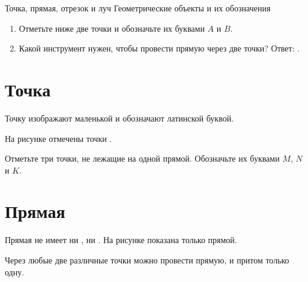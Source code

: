 
\worksheettitle
  {Точка, прямая, отрезок и луч}
  {Геометрические объекты и их обозначения}

\studentnameblock

\begin{checkpointbox}
  \begin{enumerate}[label=\textbf{\arabic*.},itemsep=0.45em]
    \item Отметьте ниже две точки и обозначьте их буквами \(A\) и \(B\).
      \workarea{13mm}
    \item Какой инструмент нужен, чтобы провести прямую через две точки?
      Ответ: \answerblank[45mm].
  \end{enumerate}
\end{checkpointbox}

\section{Точка}

\pointsexamplefigure

\begin{fillbox}[Дополните]
  Точку изображают маленькой \answerblank[28mm] и обозначают
  \answerblank[36mm] латинской буквой.

  На рисунке отмечены точки \answerblank[42mm].
\end{fillbox}

\begin{practicebox}[Задание 1]
  Отметьте три точки, не лежащие на одной прямой. Обозначьте их буквами
  \(M\), \(N\) и \(K\).
  \workarea{20mm}
\end{practicebox}

\section{Прямая}

\lineexamplefigure

\begin{fillbox}[Наблюдение]
  Прямая не имеет ни \answerblank[28mm], ни \answerblank[28mm].
  На рисунке показана только \answerblank[45mm] прямой.
\end{fillbox}

\begin{propertybox}
  Через любые две различные точки можно провести прямую, и притом только
  одну.
\end{propertybox}

